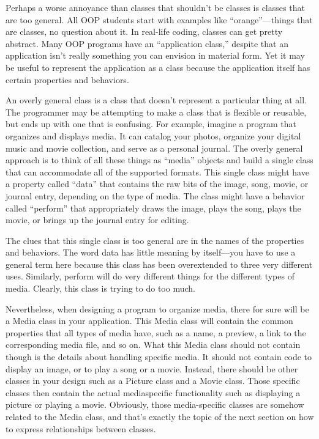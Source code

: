 Perhaps a worse annoyance than classes that shouldn’t be classes is classes that are too general. All OOP students start with examples like “orange”—things that are classes, no question about it. In real-life coding, classes can get pretty abstract. Many OOP programs have an “application class,” despite that an application isn’t really something you can envision in material form. Yet it may be useful to represent the application as a class because the application itself has certain properties and behaviors.

An overly general class is a class that doesn’t represent a particular thing at all. The programmer may be attempting to make a class that is flexible or reusable, but ends up with one that is confusing. For example, imagine a program that organizes and displays media. It can catalog your photos, organize your digital music and movie collection, and serve as a personal journal. The overly general approach is to think of all these things as “media” objects and build a single class that can accommodate all of the supported formats. This single class might have a property called “data” that contains the raw bits of the image, song, movie, or journal entry, depending on the type of media. The class might have a behavior called “perform” that appropriately draws the image, plays the song, plays the movie, or brings up the journal entry for editing.

The clues that this single class is too general are in the names of the properties and behaviors. The word data has little meaning by itself—you have to use a general term here because this class has been overextended to three very different uses. Similarly, perform will do very different things for the different types of media. Clearly, this class is trying to do too much.

Nevertheless, when designing a program to organize media, there for sure will be a Media class in your application. This Media class will contain the common properties that all types of media have, such as a name, a preview, a link to the corresponding media file, and so on. What this Media class should not contain though is the details about handling specific media. It should not contain code to display an image, or to play a song or a movie. Instead, there should be other classes in your design such as a Picture class and a Movie class. Those specific classes then contain the actual mediaspecific functionality such as displaying a picture or playing a movie. Obviously, those media-specific classes are somehow related to the Media class, and that’s exactly the topic of the next section on how to express relationships between classes.






















